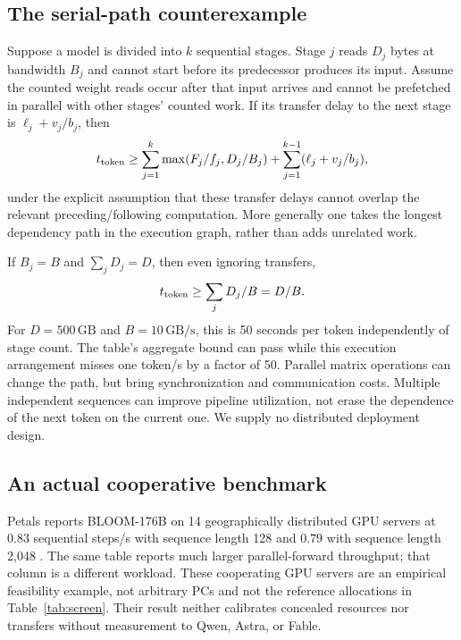 \documentclass[11pt]{article}
\newcommand{\GB}{\,\mathrm{GB}}
\begin{document}
\subsection{The serial-path counterexample}
Suppose a model is divided into $k$ sequential stages. Stage $j$ reads $D_j$ bytes at bandwidth $B_j$ and cannot start before its predecessor produces its input. Assume the counted weight reads occur after that input arrives and cannot be prefetched in parallel with other stages' counted work. If its transfer delay to the next stage is $\ell_j+v_j/b_j$, then
\begin{equation}\label{eq:path}
t_{\rm token}\ge\sum_{j=1}^k\max(F_j/f_j,D_j/B_j)
+\sum_{j=1}^{k-1}(\ell_j+v_j/b_j),
\end{equation}
under the explicit assumption that these transfer delays cannot overlap the relevant preceding/following computation. More generally one takes the longest dependency path in the execution graph, rather than adds unrelated work.

If $B_j=B$ and $\sum_jD_j=D$, then even ignoring transfers,
\begin{equation}
t_{\rm token}\ge\sum_jD_j/B=D/B.
\end{equation}
For $D=500\GB$ and $B=10\GB/\mathrm s$, this is 50 seconds per token independently of stage count. The table's aggregate bound can pass while this execution arrangement misses one token/s by a factor of 50. Parallel matrix operations can change the path, but bring synchronization and communication costs. Multiple independent sequences can improve pipeline utilization, not erase the dependence of the next token on the current one. We supply no distributed deployment design.

\subsection{An actual cooperative benchmark}
Petals reports BLOOM-176B on 14 geographically distributed GPU servers at $0.83$ sequential steps/s with sequence length 128 and $0.79$ with sequence length 2,048 \citep{petals}. The same table reports much larger parallel-forward throughput; that column is a different workload. These cooperating GPU servers are an empirical feasibility example, not arbitrary PCs and not the reference allocations in Table~\ref{tab:screen}. Their result neither calibrates concealed resources nor transfers without measurement to Qwen, Astra, or Fable.
\end{document}

